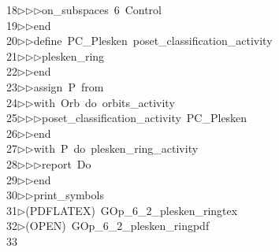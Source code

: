 \begin{tabbing}
18\>$\triangleright$\>$\triangleright$\>$\triangleright$\>on\_subspaces\ 6\ Control\ \\[0pt]
19\>$\triangleright$\>$\triangleright$\>end\ \\[0pt]
20\>$\triangleright$\>$\triangleright$\>define\ PC\_Plesken\ poset\_classification\_activity\ \\[0pt]
21\>$\triangleright$\>$\triangleright$\>$\triangleright$\>plesken\_ring\ \\[0pt]
22\>$\triangleright$\>$\triangleright$\>end\ \\[0pt]
23\>$\triangleright$\>$\triangleright$\>assign\ P\ from\ \\[0pt]
24\>$\triangleright$\>$\triangleright$\>with\ Orb\ do\ orbits\_activity\ \\[0pt]
25\>$\triangleright$\>$\triangleright$\>$\triangleright$\>poset\_classification\_activity\ PC\_Plesken\ \\[0pt]
26\>$\triangleright$\>$\triangleright$\>end\ \\[0pt]
27\>$\triangleright$\>$\triangleright$\>with\ P\ do\ plesken\_ring\_activity\ \\[0pt]
28\>$\triangleright$\>$\triangleright$\>$\triangleright$\>report\ Do\ \\[0pt]
29\>$\triangleright$\>$\triangleright$\>end\ \\[0pt]
30\>$\triangleright$\>$\triangleright$\>print\_symbols\\[0pt]
31\>$\triangleright$\>(PDFLATEX)\ GOp\_6\_2\_plesken\_ringtex\\[0pt]
32\>$\triangleright$\>(OPEN)\ GOp\_6\_2\_plesken\_ringpdf\\[0pt]
33\>\end{tabbing}
